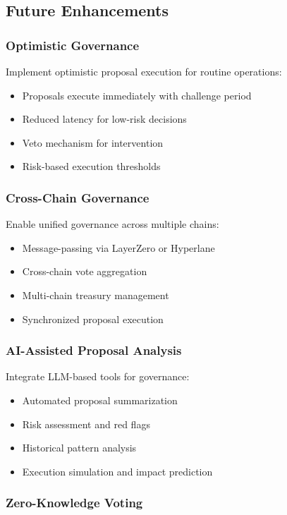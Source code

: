 \subsection{Future Enhancements}

\subsubsection{Optimistic Governance}

Implement optimistic proposal execution for routine operations:
\begin{itemize}
    \item Proposals execute immediately with challenge period
    \item Reduced latency for low-risk decisions
    \item Veto mechanism for intervention
    \item Risk-based execution thresholds
\end{itemize}

\subsubsection{Cross-Chain Governance}

Enable unified governance across multiple chains:
\begin{itemize}
    \item Message-passing via LayerZero or Hyperlane
    \item Cross-chain vote aggregation
    \item Multi-chain treasury management
    \item Synchronized proposal execution
\end{itemize}

\subsubsection{AI-Assisted Proposal Analysis}

Integrate LLM-based tools for governance:
\begin{itemize}
    \item Automated proposal summarization
    \item Risk assessment and red flags
    \item Historical pattern analysis
    \item Execution simulation and impact prediction
\end{itemize}

\subsubsection{Zero-Knowledge Voting}

